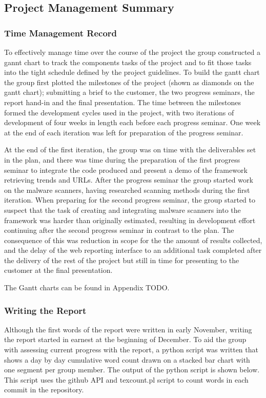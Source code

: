 \subsection{Project Management Summary}

\subsubsection{Time Management Record}

To effectively manage time over the course of the project the group constructed
a gannt chart to track the components tasks of the project and to fit those tasks into the
tight schedule defined by the project guidelines. To build the gantt chart the
group first plotted the milestones of the project (shown as diamonds on the
gantt chart); submitting a brief to the
customer, the two progress seminars, the report hand-in and the final
presentation. The time between the milestones formed the development cycles
used in the project, with two iterations of development of four weeks in length
each before each progress seminar. One week at the end of each iteration was
left for preparation of the progress seminar.

At the end of the first iteration, the group was on time with the deliverables
set in the plan, and there was time during the preparation of the first progress
seminar to integrate the code produced and present a demo of the framework
retrieving trends and URLs. After the progress seminar the group started work on
the malware scanners, having researched scanning methods during the first
iteration. When preparing for the second progress seminar, the group started to
suspect that the task of creating and integrating malware scanners into the
framework was harder than originally estimated, resulting in development effort
continuing after the second progress seminar in contrast to the plan. The
consequence of this was reduction in scope for the the amount of results
collected, and the delay of the web reporting interface to an additional task
completed after the delivery of the rest of the project but still in time for
presenting to the customer at the final presentation.

The Gantt charts can be found in Appendix TODO.

\subsubsection{Writing the Report}

Although the first words of the report were written in early November, writing
the report started in earnest at the beginning of December. To aid the group
with assessing current progress with the report, a python script was written
that shows a day by day cumulative word count drawn on a stacked bar chart with
one segment per group member. The output of the python script is shown below.
This script uses the github API and texcount.pl script to count words in each
commit in the repository.

